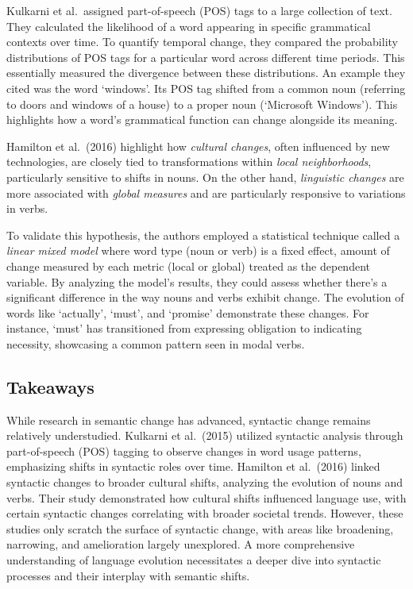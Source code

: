 Kulkarni et al.\ assigned part-of-speech (POS) tags to a large collection of text.
They calculated the likelihood of a word appearing in specific grammatical contexts over time.
To quantify temporal change, they compared the probability distributions of POS tags for a particular word across different time periods.
This essentially measured the divergence between these distributions.
An example they cited was the word `windows'.
Its POS tag shifted from a common noun (referring to doors and windows of a house) to a proper noun (`Microsoft Windows').
This highlights how a word's grammatical function can change alongside its meaning.

Hamilton et al.\ (2016) highlight how \emph{cultural changes}, often influenced by new technologies, are closely tied to transformations within \emph{local neighborhoods}, particularly sensitive to shifts in nouns.
On the other hand, \emph{linguistic changes} are more associated with \emph{global measures} and are particularly responsive to variations in verbs.

To validate this hypothesis, the authors employed a statistical technique called a \emph{linear mixed model} where word type (noun or verb) is a fixed effect,
amount of change measured by each metric (local or global) treated as the dependent variable.
By analyzing the model's results, they could assess whether there's a significant difference in the way nouns and verbs exhibit change.
The evolution of words like `actually', `must', and `promise' demonstrate these changes.
For instance, `must' has transitioned from expressing obligation to indicating necessity, showcasing a common pattern seen in modal verbs.

\subsection{Takeaways}
While research in semantic change has advanced, syntactic change remains relatively understudied.
Kulkarni et al.\ (2015) utilized syntactic analysis through part-of-speech (POS) tagging to observe changes in word usage patterns, emphasizing shifts in syntactic roles over time.
Hamilton et al.\ (2016) linked syntactic changes to broader cultural shifts, analyzing the evolution of nouns and verbs.
Their study demonstrated how cultural shifts influenced language use, with certain syntactic changes correlating with broader societal trends.
However, these studies only scratch the surface of syntactic change, with areas like broadening, narrowing, and amelioration largely unexplored.
A more comprehensive understanding of language evolution necessitates a deeper dive into syntactic processes and their interplay with semantic shifts.

